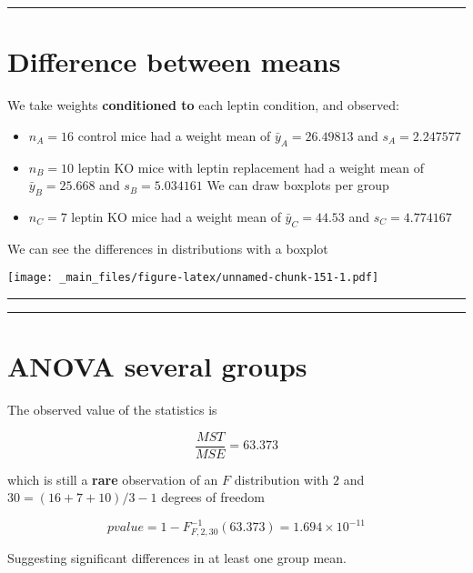 \documentclass[
]{book}
\begin{document}
\begin{center}\rule{0.5\linewidth}{0.5pt}\end{center}

\hypertarget{difference-between-means-9}{%
\section{Difference between means}\label{difference-between-means-9}}

We take weights \textbf{conditioned to} each leptin condition, and observed:

\begin{itemize}
\item
  \(n_A=16\) control mice had a weight mean of \(\bar{y}_A=26.49813\) and \(s_A=2.247577\)
\item
  \(n_B=10\) leptin KO mice with leptin replacement had a weight mean of \(\bar{y}_B=25.668\) and \(s_B=5.034161\)
  We can draw boxplots per group
\item
  \(n_C=7\) leptin KO mice had a weight mean of \(\bar{y}_C=44.53\) and \(s_C=4.774167\)
\end{itemize}

We can see the differences in distributions with a boxplot

\texttt{[image: \_main\_files/figure-latex/unnamed-chunk-151-1.pdf]}

\begin{center}\rule{0.5\linewidth}{0.5pt}\end{center}

\begin{center}\rule{0.5\linewidth}{0.5pt}\end{center}

\hypertarget{anova-several-groups-3}{%
\section{ANOVA several groups}\label{anova-several-groups-3}}

The observed value of the statistics is

\[\frac{MST}{MSE}=63.373\]

which is still a \textbf{rare} observation of an \(F\) distribution with \(2\) and \(30=(16+7+10)/3-1\) degrees of freedom

\[pvalue=1-F^{-1}_{F,2,30}(63.373)=1.694 \times 10^{-11}\]

Suggesting significant differences in at least one group mean.
\end{document}

